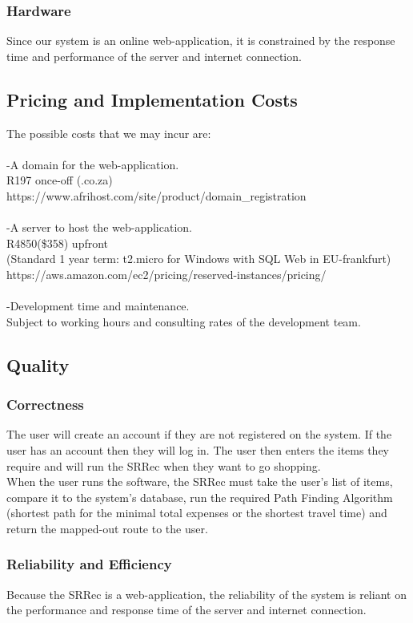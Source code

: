 \documentclass[12pt]{article}
\begin{document}
\subsubsection{Hardware}
Since our system is an online web-application, it is constrained by the response time and performance of the server and internet connection.

\subsection{Pricing and Implementation Costs}
The possible costs that we may incur are:\\\\
-A domain for the web-application.\\
 R197 once-off   (.co.za)\\
 https://www.afrihost.com/site/product/domain{\_}registration\\\\
-A server to host the web-application.\\
R4850(\$358) upfront \\
(Standard 1 year term: t2.micro for Windows with SQL Web in EU-frankfurt)\\
https://aws.amazon.com/ec2/pricing/reserved-instances/pricing/\\\\
-Development time and maintenance.\\
Subject to working hours and consulting rates of the development team.

\subsection{Quality}
\subsubsection{Correctness}
The user will create an account if they are not registered on the system. If the user has an account then they will log in. The user then enters the items they require and will run the SRRec when they want to go shopping.\\
When the user runs the software, the SRRec must take the user's list of items, compare it to the system's database, run the required Path Finding Algorithm (shortest path for the minimal total expenses or the shortest travel time) and return the mapped-out route to the user.
\subsubsection{Reliability and Efficiency}
Because the SRRec is a web-application, the reliability of the system is reliant on the performance and response time of the server and internet connection. 
\end{document}
